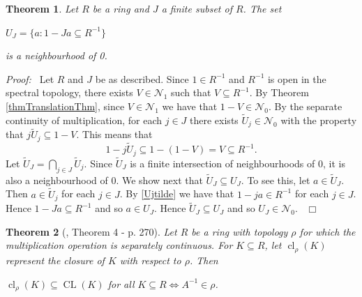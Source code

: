\documentclass[12pt, oneside]{book}
\newtheorem{theorem}{Theorem}[subsection]
\newcommand{\proof}{{\noindent \it Proof:~}}
\newcommand{\qed}{\hfill ~$\Box$\\}
\def\cl{\operatorname{cl}}
\def\CL{\operatorname{CL}}
\begin{document}
\begin{theorem} \label{NbhoodsOf0}
\normalfont 
\noindent Let $R$ be a ring and $J$ a finite subset of $R$. The set
\begin{center}
$U_J = \{ a : 1 - Ja \subseteq R^{-1} \}$
\end{center}
is a neighbourhood of 0.
\end{theorem}
\proof \space
Let $R$ and $J$ be as described. Since $1 \in R^{-1}$ and $R^{-1}$ is open in the spectral topology,
there exists $V \in \mathcal{N}_1$ such that $V \subseteq R^{-1}$. By Theorem \ref{thmTranslationThm}, 
since $V \in \mathcal{N}_1$ we have that $1 - V \in \mathcal{N}_0$. 
By the separate continuity of multiplication, for each $j \in J$ there exists 
$\widetilde{U}_j \in \mathcal{N}_0$ with the property that $j \widetilde{U}_j \subseteq 1 - V.$ 
This means that 
\begin{equation} \label{Ujtilde}
1 - j \widetilde{U}_j \subseteq 1 - (1 - V) = V \subseteq R^{-1}.
\end{equation}
\noindent Let $\widetilde{U}_J = 
\displaystyle \bigcap_{j \in J} \widetilde{U}_j$. Since $\widetilde{U}_J$ is a finite intersection 
of neighbourhoods of 0, it is also a neighbourhood of 0.
\vskip 0.3cm
\noindent We show next that $\widetilde{U}_J \subseteq U_J$. To see this, let $a \in \widetilde{U}_J$.
Then $a \in \widetilde{U}_j$ for each $j \in J$.  By \eqref{Ujtilde} we have that $1 - ja \in R^{-1}$ 
for each $j \in J$. Hence $1 - Ja \subseteq R^{-1}$ and so $a \in U_J$. 
Hence $\widetilde{U}_J \subseteq U_J$ and so $U_J \in \mathcal{N}_0$.
\qed
\begin{theorem}[\cite{CH3}, Theorem 4 - p. 270] 
\normalfont
\noindent Let $R$ be a ring with topology $\rho$ for which the multiplication operation is 
separately continuous. For $K \subseteq R$, let $\cl_{\rho}(K)$ represent the closure of $K$ with 
respect to $\rho$. Then 
\begin{center}
$\cl_{\rho}(K) \subseteq \CL(K)$ for all $K \subseteq R \iff A^{-1} \in \rho$.
\end{center}
\end{theorem}
\end{document}

